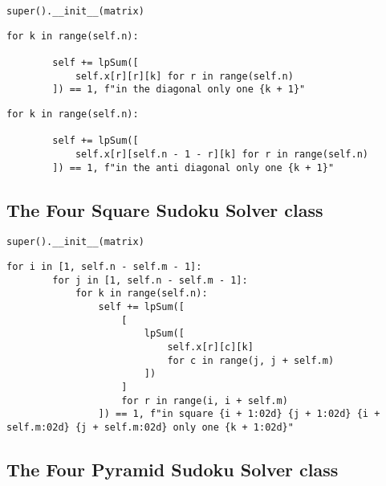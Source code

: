 \documentclass[12pt]{article}
\begin{document}
\begin{lstlisting}[caption={Initializing the \textbf{SudokuLP}} super class]
    super().__init__(matrix)
\end{lstlisting}

\begin{lstlisting}[caption={Declaring that there should only be one \textit{k} in the positive diagonal}]
    for k in range(self.n):

        self += lpSum([
            self.x[r][r][k] for r in range(self.n)
        ]) == 1, f"in the diagonal only one {k + 1}"
\end{lstlisting}

\begin{lstlisting}[caption={Declaring that there should only be one \textit{k} in the negative diagonal}]
    for k in range(self.n):

        self += lpSum([
            self.x[r][self.n - 1 - r][k] for r in range(self.n)
        ]) == 1, f"in the anti diagonal only one {k + 1}"
\end{lstlisting}

\pagebreak

\subsection{The Four Square Sudoku Solver class}

\begin{lstlisting}[caption={Initializing the \textbf{SudokuLP}} super class]
    super().__init__(matrix)
\end{lstlisting}

\begin{lstlisting}[caption={Declaring that there should only be one \textit{k} in each shaded square}]
    for i in [1, self.n - self.m - 1]:
        for j in [1, self.n - self.m - 1]:
            for k in range(self.n):
                self += lpSum([
                    [
                        lpSum([
                            self.x[r][c][k]
                            for c in range(j, j + self.m)
                        ])
                    ]
                    for r in range(i, i + self.m)
                ]) == 1, f"in square {i + 1:02d} {j + 1:02d} {i + self.m:02d} {j + self.m:02d} only one {k + 1:02d}"
\end{lstlisting}

\pagebreak

\subsection{The Four Pyramid Sudoku Solver class}
\end{document}
